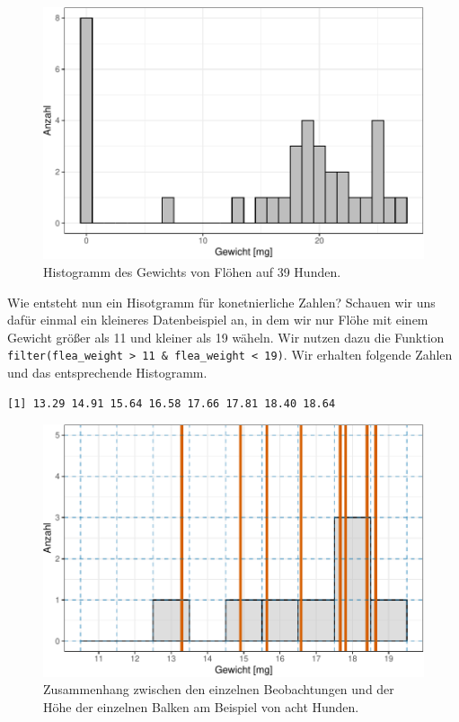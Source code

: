 \documentclass[
  letterpaper,
  DIV=11,
  oneside]{scrreport}
\begin{document}
\begin{figure}[H]

{\centering \includegraphics{./eda-ggplot_files/figure-pdf/fig-hist-flea-1-1.pdf}

}

\caption{\label{fig-hist-flea-1}Histogramm des Gewichts von Flöhen auf
39 Hunden.}

\end{figure}

Wie entsteht nun ein Hisotgramm für konetnierliche Zahlen? Schauen wir
uns dafür einmal ein kleineres Datenbeispiel an, in dem wir nur Flöhe
mit einem Gewicht größer als 11 und kleiner als 19 wäheln. Wir nutzen
dazu die Funktion
\texttt{filter(flea\_weight\ \textgreater{}\ 11\ \&\ flea\_weight\ \textless{}\ 19)}.
Wir erhalten folgende Zahlen und das entsprechende Histogramm.

\begin{verbatim}
[1] 13.29 14.91 15.64 16.58 17.66 17.81 18.40 18.64
\end{verbatim}

\begin{figure}

{\centering \includegraphics{./eda-ggplot_files/figure-pdf/fig-hist-flea-2-1.pdf}

}

\caption{\label{fig-hist-flea-2}Zusammenhang zwischen den einzelnen
Beobachtungen und der Höhe der einzelnen Balken am Beispiel von acht
Hunden.}

\end{figure}
\end{document}
